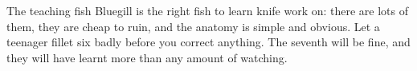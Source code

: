 \begin{telospanel}{The teaching fish}
Bluegill is the right fish to learn knife work on: there are lots of them, they are cheap to ruin, and the anatomy is simple and obvious. Let a teenager fillet six badly before you correct anything. The seventh will be fine, and they will have learnt more than any amount of watching.
\end{telospanel}

\advisorypanfish

